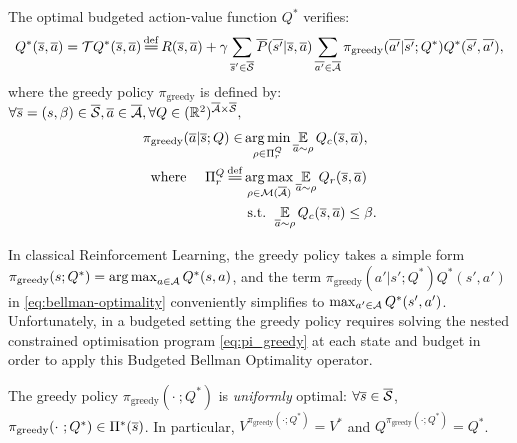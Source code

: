\begin{theorem}
	\begin{leftbar}[theorembar]
	\label{thm:bellman-optimality}
	The optimal budgeted action-value function $Q^*$ verifies:
	\begin{equation}
	\label{eq:bellman-optimality}
	Q^{*}(\os, \oa) = \cT Q^{*}(\os, \oa) \eqdef R(\os, \oa) + \gamma \sum_{\os'\in\ocS} \ov{P}(\ov{s'} | \os, \oa)\sum_{\ov{a'}\in \ocA} \pi_\text{greedy}(\ov{a'}|\ov{s'}; Q^*) Q^{*}(\ov{s'}, \ov{a'}),
	\end{equation}
	where the greedy policy $\pi_\text{greedy}$ is defined by: $\forall \overline{s}=(s,\beta)\in \overline{\mathcal{S}}, \overline{a}\in 
	\overline{\mathcal{A}}, \forall Q\in(\mathbb{R}^2)^{\overline{\mathcal{A}}\times\overline{\mathcal{S}}},$
	\begin{subequations}
		\label{eq:pi_greedy}
		\begin{align}
		\pi_\text{greedy}(\oa|\os; Q) \in &\argmin_{\rho\in\Pi_r^Q} \expectedvalueover{\oa\sim\rho}Q_c(\os, \oa), \label{eq:pi_greedy_cost}\\
		\text{where }\quad\Pi_r^Q \eqdef &\argmax_{\rho\in\cM(\ocA)} \expectedvalueover{\oa\sim\rho} Q_r(\os, \oa) \label{eq:pi_greedy_reward}\\
		& \text{ s.t. }  \expectedvalueover{\oa\sim\rho} Q_c(\os, \oa) \leq \beta. \label{eq:pi_greedy_constraint}
		\end{align}
	\end{subequations}
	\end{leftbar}
\end{theorem}

\begin{remark}
	\label{rmk:greedy}
	In classical Reinforcement Learning, the greedy policy takes a simple form $\pi_\text{greedy}(s; Q^*) = \operatorname*{arg\,max}_{a\in\mathcal{A}} Q^*(s, a)$, and the term $\pi_\text{greedy}(a'|s';Q^*) Q^{*}(s', a')$ in \eqref{eq:bellman-optimality} conveniently simplifies to $\max_{a'\in \mathcal{A}} Q^*(s', a')$. Unfortunately, in a budgeted setting the greedy policy requires solving the nested constrained optimisation program \eqref{eq:pi_greedy} at each state and budget in order to apply this Budgeted Bellman Optimality operator.
\end{remark}

\begin{proposition}
	\begin{leftbar}[propositionbar]
	\label{prop:greedy_optimal}
	The greedy policy $\pi_\text{greedy}(\cdot~; Q^*)$ is \emph{uniformly} optimal: $\forall\overline{s}\in\overline{\mathcal{S}}$, $\pi_\text{greedy}(\cdot~; Q^*)\in\Pi^*(\overline{s})$. In particular, $V^{\pi_\text{greedy}(\cdot; Q^*)} = V^*$ and $Q^{\pi_\text{greedy}(\cdot; Q^*)}= Q^*$.
	\end{leftbar}
\end{proposition}

